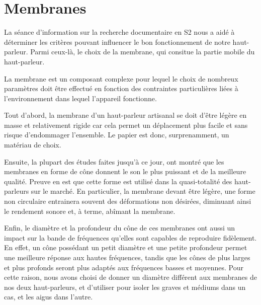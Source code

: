 \section{Membranes}

La séance d’information sur la recherche documentaire en S2
nous a aidé à déterminer les critères pouvant influencer
le bon fonctionnement de notre haut-parleur.
Parmi ceux-là, le choix de la membrane, qui consitue la partie mobile
du haut-parleur.

La membrane est un composant complexe
pour lequel le choix de nombreux paramètres
doit être effectué en fonction des contraintes particulières liées
à l'environnement dans lequel l'appareil fonctionne.

Tout d’abord, la membrane d’un haut-parleur artisanal
se doit d’être légère en masse et relativement rigide
car cela permet un déplacement plus facile et
sans risque d’endommager l’ensemble.
Le papier est donc, surprenamment, un matériau de choix.

Ensuite, la plupart des études faites jusqu’à ce jour,
ont montré que les membranes en forme de cône
donnent le son le plus puissant et de la meilleure qualité.
Preuve en est que cette forme est utilisé dans la quasi-totalité
des haut-parleurs sur le marché.
En particulier, la membrane devant être légère,
une forme non circulaire entrainera souvent des déformations non désirées,
diminuant ainsi le rendement sonore et, à terme, abîmant la membrane.

Enfin, le diamètre et la profondeur du cône de ces membranes
ont aussi un impact sur la bande de fréquences
qu’elles sont capables de reproduire fidèlement.
En effet, un cône possédant un petit diamètre et une petite profondeur
permet une meilleure réponse aux hautes fréquences,
tandis que les cônes de plus larges et plus profonds
seront plus adaptés aux fréquences basses et moyennes.
Pour cette raison, nous avons choisi de donner un diamètre
différent aux membranes de nos deux haut-parleurs,
et d'utiliser pour isoler les graves et médiums dans un cas,
et les aigus dans l'autre.
